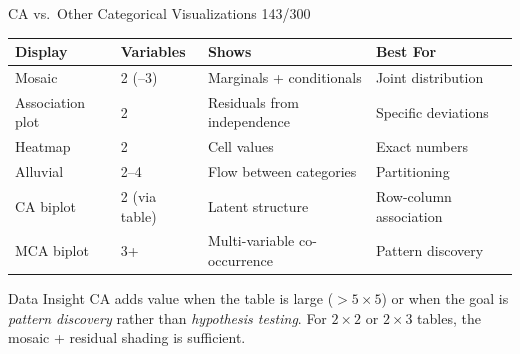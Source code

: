 \documentclass[10pt]{beamer}
\newcommand{\smark}[1]{\hfill{\scriptsize\color{codegray}#1}}
\begin{document}
\begin{frame}{CA vs.\ Other Categorical Visualizations}
\smark{143/300}
\centering\small
\begin{tabular}{@{}llll@{}}
    \toprule
    \textbf{Display} & \textbf{Variables} & \textbf{Shows} & \textbf{Best For} \\
    \midrule
    Mosaic              & 2 (--3)   & Marginals + conditionals    & Joint distribution \\
    Association plot    & 2         & Residuals from independence  & Specific deviations \\
    Heatmap             & 2         & Cell values                  & Exact numbers \\
    Alluvial            & 2--4      & Flow between categories      & Partitioning \\
    CA biplot           & 2 (via table)& Latent structure           & Row-column association \\
    MCA biplot          & 3+        & Multi-variable co-occurrence & Pattern discovery \\
    \bottomrule
\end{tabular}

\vspace{0.3cm}
\begin{exampleblock}{Data Insight}
    \scriptsize CA adds value when the table is large ($> 5 \times 5$) or when the goal is \emph{pattern discovery} rather than \emph{hypothesis testing}. For $2 \times 2$ or $2 \times 3$ tables, the mosaic + residual shading is sufficient.
\end{exampleblock}
\end{frame}
\end{document}
